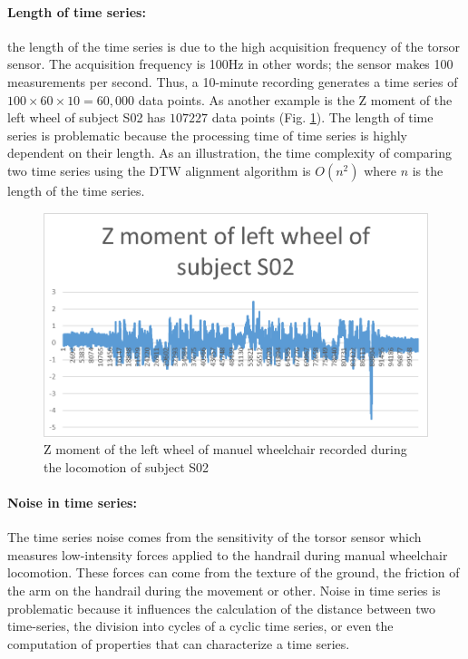 \paragraph{Length of time series:} the length of the time series is due to the high acquisition frequency of the torsor sensor. The acquisition frequency is 100Hz in other words; the sensor makes 100 measurements per second. Thus, a 10-minute recording generates a time series of $100 \times 60 \times 10 = 60,000$ data points. As another example is the Z moment of the left wheel of subject S02 has $107 227$ data points (Fig. \ref{mz_left_wheel}). The length of time series is problematic because the processing time of time series is highly dependent on their length. As an illustration, the time complexity of comparing two time series using the DTW alignment algorithm is $O(n^2)$ where $n$ is the length of the time series.

\begin{figure}[h]
\center
\includegraphics[scale = 0.6]{images/mz_left_wheel}
\caption{Z moment of the left wheel of manuel wheelchair recorded during the locomotion of subject S02}
\label{mz_left_wheel}
\end{figure}


\paragraph{Noise in time series:} The time series noise comes from the sensitivity of the torsor sensor which measures low-intensity forces applied to the handrail during manual wheelchair locomotion. These forces can come from the texture of the ground, the friction of the arm on the handrail during the movement or other. Noise in time series is problematic because it influences the calculation of the distance between two time-series, the division into cycles of a cyclic time series, or even the computation of properties that can characterize a time series.

